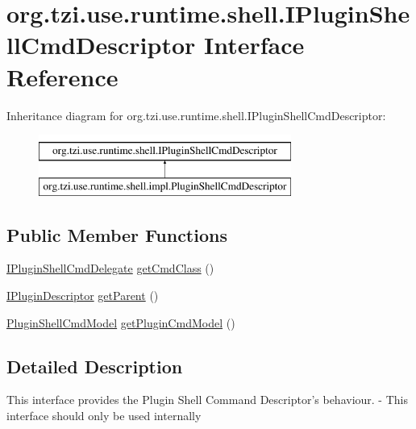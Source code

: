 \hypertarget{interfaceorg_1_1tzi_1_1use_1_1runtime_1_1shell_1_1_i_plugin_shell_cmd_descriptor}{\section{org.\-tzi.\-use.\-runtime.\-shell.\-I\-Plugin\-Shell\-Cmd\-Descriptor Interface Reference}
\label{interfaceorg_1_1tzi_1_1use_1_1runtime_1_1shell_1_1_i_plugin_shell_cmd_descriptor}
}
Inheritance diagram for org.\-tzi.\-use.\-runtime.\-shell.\-I\-Plugin\-Shell\-Cmd\-Descriptor\-:\begin{figure}[H]
\begin{center}
\leavevmode
\includegraphics[height=2.000000cm]{interfaceorg_1_1tzi_1_1use_1_1runtime_1_1shell_1_1_i_plugin_shell_cmd_descriptor}
\end{center}
\end{figure}
\subsection*{Public Member Functions}
\begin{DoxyCompactItemize}
\item 
\hyperlink{interfaceorg_1_1tzi_1_1use_1_1runtime_1_1shell_1_1_i_plugin_shell_cmd_delegate}{I\-Plugin\-Shell\-Cmd\-Delegate} \hyperlink{interfaceorg_1_1tzi_1_1use_1_1runtime_1_1shell_1_1_i_plugin_shell_cmd_descriptor_af8f9cc43f10f90f0a2d79967b58e8f96}{get\-Cmd\-Class} ()
\item 
\hyperlink{interfaceorg_1_1tzi_1_1use_1_1runtime_1_1_i_plugin_descriptor}{I\-Plugin\-Descriptor} \hyperlink{interfaceorg_1_1tzi_1_1use_1_1runtime_1_1shell_1_1_i_plugin_shell_cmd_descriptor_a33898a4321e33a3f7d3564e4a8a31723}{get\-Parent} ()
\item 
\hyperlink{classorg_1_1tzi_1_1use_1_1runtime_1_1model_1_1_plugin_shell_cmd_model}{Plugin\-Shell\-Cmd\-Model} \hyperlink{interfaceorg_1_1tzi_1_1use_1_1runtime_1_1shell_1_1_i_plugin_shell_cmd_descriptor_a538cf987a12bd6c53d52a41399b53b69}{get\-Plugin\-Cmd\-Model} ()
\end{DoxyCompactItemize}


\subsection{Detailed Description}
This interface provides the Plugin Shell Command Descriptor's behaviour. -\/ This interface should only be used internally

